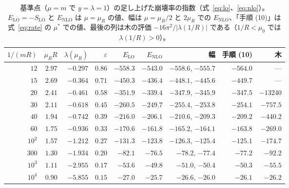 \documentclass[a4paper,10pt]{ltjsarticle}
\begin{document}
\begin{table}[tbp]
\centering\small
\caption{基準点（$\mu=m$ で $y=\lambda=1$）の足し上げた崩壊率の指数（式~\eqref{eq:lo}、\eqref{eq:nlo}）。$E_{\mathrm{LO}}=-S_{\mathrm{LO}}$ と $E_{\mathrm{NLO}}$ は $\mu=\mu_R$ の値、幅は $\mu=\mu_R/2$ と $2\mu_R$ での $E_{\mathrm{NLO}}$、「手順 (10)」は式~\eqref{eq:rate} の $\mu^*$ での値、最後の列は木の評価 $-16\pi^2/|\lambda(1/R)|$ である（$1/R<\mu_0$ では $\lambda(1/R)>0$）。}
\label{tab:resum}
\setlength{\tabcolsep}{4pt}
\begin{tabular}{rrrrrrrrr}
\toprule
$1/(mR)$ & $\mu_RR$ & $\lambda(\mu_R)$ & $\varepsilon$ & $E_{\mathrm{LO}}$ & $E_{\mathrm{NLO}}$ & 幅 & 手順 (10) & 木 \\
\midrule
$12$ & $2.97$ & $-0.297$ & $0.86$ & $-558.3$ & $-543.0$ & $-558.6$, $-555.7$ & $-564.0$ & — \\
$15$ & $2.69$ & $-0.364$ & $0.71$ & $-450.3$ & $-436.4$ & $-448.1$, $-445.6$ & $-449.7$ & — \\
$20$ & $2.41$ & $-0.461$ & $0.58$ & $-351.9$ & $-339.4$ & $-347.9$, $-345.9$ & $-347.5$ & $-13240$ \\
$30$ & $2.11$ & $-0.618$ & $0.45$ & $-260.5$ & $-249.7$ & $-255.4$, $-253.8$ & $-254.1$ & $-757.5$ \\
$40$ & $1.94$ & $-0.742$ & $0.39$ & $-216.0$ & $-206.1$ & $-210.6$, $-209.3$ & $-209.2$ & $-440.2$ \\
$60$ & $1.75$ & $-0.936$ & $0.33$ & $-170.6$ & $-161.8$ & $-165.2$, $-164.1$ & $-163.8$ & $-269.0$ \\
$10^2$ & $1.57$ & $-1.212$ & $0.27$ & $-131.3$ & $-123.8$ & $-126.3$, $-125.4$ & $-125.1$ & $-174.7$ \\
$300$ & $1.30$ & $-1.934$ & $0.20$ & $-82.1$ & $-76.5$ & $-78.2$, $-77.4$ & $-77.2$ & $-92.2$ \\
$10^3$ & $1.11$ & $-2.955$ & $0.17$ & $-53.6$ & $-49.8$ & $-51.0$, $-50.4$ & $-50.3$ & $-55.5$ \\
$10^4$ & $0.90$ & $-5.855$ & $0.15$ & $-27.0$ & $-25.7$ & $-26.6$, $-26.0$ & $-26.1$ & $-26.2$ \\
\bottomrule
\end{tabular}
\end{table}
\end{document}

